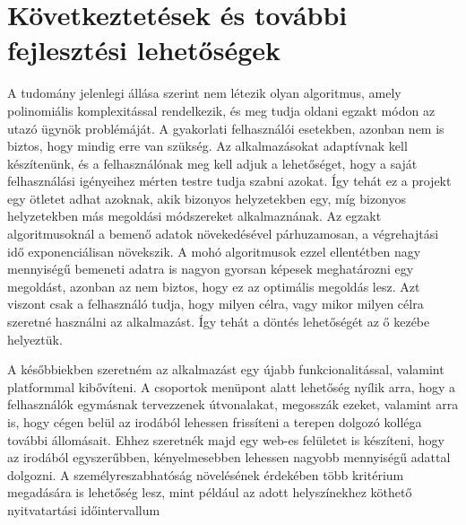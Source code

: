 \chapter{Következtetések és további fejlesztési lehetőségek}\label{ch:ALAP}

A tudomány jelenlegi állása szerint nem létezik olyan algoritmus, amely polinomiális komplexitással rendelkezik, és meg tudja oldani egzakt módon az utazó ügynök problémáját. A gyakorlati felhasználói esetekben, azonban nem is biztos, hogy mindig erre van szükség. Az alkalmazásokat adaptívnak kell készítenünk, és a felhasználónak meg kell adjuk a lehetőséget, hogy a saját felhasználási igényeihez mérten testre tudja szabni azokat. Így tehát ez a projekt egy ötletet adhat azoknak, akik bizonyos helyzetekben egy, míg bizonyos helyzetekben más megoldási módszereket alkalmaznának. Az egzakt algoritmusoknál a bemenő adatok növekedésével párhuzamosan, a végrehajtási idő exponenciálisan növekszik. A mohó algoritmusok ezzel ellentétben nagy mennyiségű bemeneti adatra is nagyon gyorsan képesek meghatározni egy megoldást, azonban az nem biztos, hogy ez az optimális megoldás lesz. Azt viszont csak a felhasználó tudja, hogy milyen célra, vagy mikor milyen célra szeretné használni az alkalmazást. Így tehát a döntés lehetőségét az ő kezébe helyeztük.

A későbbiekben szeretném az alkalmazást egy újabb funkcionalitással, valamint platformmal kibővíteni. A csoportok menüpont alatt lehetőség nyílik arra, hogy a felhasználók egymásnak tervezzenek útvonalakat, megosszák ezeket, valamint arra is, hogy cégen belül az irodából lehessen frissíteni a terepen dolgozó kolléga további állomásait. Ehhez szeretnék majd egy web-es felületet is készíteni, hogy az irodából egyszerűbben, kényelmesebben lehessen nagyobb mennyiségű adattal dolgozni. A személyreszabhatóság növelésének érdekében több kritérium megadására is lehetőség lesz, mint például az adott helyszínekhez köthető nyitvatartási időintervallum\cite{gt_problem}\cite{gt_and_appl}\cite{gt_alg_india}\cite{comp_tsp}
